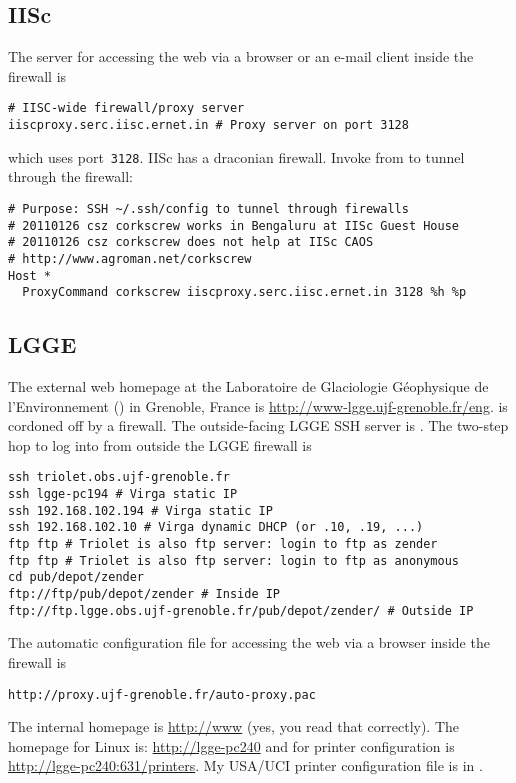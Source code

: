 \documentclass[12pt,twoside]{article}
\begin{document}
\subsection{IISc}\label{sxn:iisc}
The  server for accessing the web via a browser or
an e-mail client inside the firewall is 
\begin{verbatim}
# IISC-wide firewall/proxy server
iiscproxy.serc.iisc.ernet.in # Proxy server on port 3128
\end{verbatim}
which uses port~\texttt{3128}.
IISc has a draconian firewall.
Invoke  from  
to tunnel through the firewall:
\begin{verbatim}
# Purpose: SSH ~/.ssh/config to tunnel through firewalls
# 20110126 csz corkscrew works in Bengaluru at IISc Guest House
# 20110126 csz corkscrew does not help at IISc CAOS
# http://www.agroman.net/corkscrew
Host *
  ProxyCommand corkscrew iiscproxy.serc.iisc.ernet.in 3128 %h %p
\end{verbatim}

\subsection{LGGE}\label{sxn:lgge}
The external web homepage at the
Laboratoire de Glaciologie G\'{e}ophysique de l'Environnement 
() in Grenoble, France is 
\url{http://www-lgge.ujf-grenoble.fr/eng}.
 is cordoned off by a firewall.
The outside-facing LGGE SSH server is
. 
The two-step hop to log into  from outside the LGGE
firewall is  
\begin{verbatim}
ssh triolet.obs.ujf-grenoble.fr
ssh lgge-pc194 # Virga static IP
ssh 192.168.102.194 # Virga static IP
ssh 192.168.102.10 # Virga dynamic DHCP (or .10, .19, ...)
ftp ftp # Triolet is also ftp server: login to ftp as zender
ftp ftp # Triolet is also ftp server: login to ftp as anonymous
cd pub/depot/zender
ftp://ftp/pub/depot/zender # Inside IP
ftp://ftp.lgge.obs.ujf-grenoble.fr/pub/depot/zender/ # Outside IP
\end{verbatim}
The automatic  configuration file for accessing the web
via a browser inside the firewall is
\begin{verbatim}
http://proxy.ujf-grenoble.fr/auto-proxy.pac
\end{verbatim}

The internal  homepage is 
\url{http://www} (yes, you read that correctly).
The  homepage for Linux is:
\url{http://lgge-pc240}
and for printer configuration is
\url{http://lgge-pc240:631/printers}.
My USA/UCI printer configuration file is in
.
\end{document}
